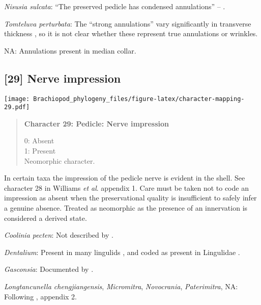 \documentclass[openany]{book}
\theoremstyle{definition}
\theoremstyle{definition}
\theoremstyle{definition}
\theoremstyle{remark}
\begin{document}
\hypertarget{Nisusia_sulcata-coding-28}{}
\emph{Nisusia sulcata}: ``The preserved pedicle has condensed
annulations'' -- \citet{Zhang2011Theexceptionally}.

\hypertarget{Tomteluva_perturbata-coding-28}{}
\emph{Tomteluva perturbata}: The ``strong annulations'' vary
significantly in transverse thickness
\citep{Holmer2018Evolutionarysignificance}, so it is not clear whether
these represent true annulations or wrinkles.

\hypertarget{NA-coding-28}{}
NA: Annulations present in median collar.

\subsection*{{[}29{]} Nerve impression}\label{nerve-impression}

\texttt{[image: Brachiopod\_phylogeny\_files/figure-latex/character-mapping-29.pdf]}

\begin{quote}
\textbf{Character 29: Pedicle: Nerve impression}

0: Absent\\
1: Present\\
Neomorphic character.
\end{quote}

In certain taxa the impression of the pedicle nerve is evident in the
shell. See character 28 in Williams \emph{et al}.
\citeyearpar{Williams1998Thediversity} appendix 1. Care must be taken
not to code an impression as absent when the preservational quality is
insufficient to safely infer a genuine absence. Treated as neomorphic as
the presence of an innervation is considered a derived state.

\hypertarget{Coolinia_pecten-coding-29}{}
\emph{Coolinia pecten}: Not described by
\citet{Williams2000LinguliformeaCraniiformea}.

\hypertarget{Dentalium-coding-29}{}
\emph{Dentalium}: Present in many lingulids
\citep{Williams2000LinguliformeaCraniiformea}, and coded as present in
Lingulidae \citep[table 6]{Williams2000LinguliformeaCraniiformea}.

\hypertarget{Gasconsia-coding-29}{}
\emph{Gasconsia}: Documented by \citet{Skovsted2017Depthrelated}.

\hypertarget{Longtancunella_chengjiangensis-coding-29}{}
\emph{Longtancunella chengjiangensis}, \emph{Micromitra},
\emph{Novocrania}, \emph{Paterimitra}, NA: Following
\citet{Williams1998Thediversity}, appendix 2.
\end{document}
